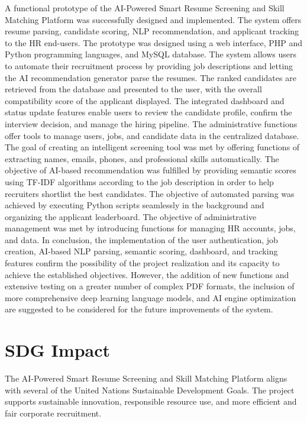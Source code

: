\documentclass[12pt,a4paper]{report}
\begin{document}
A functional prototype of the AI-Powered Smart Resume Screening and Skill Matching Platform was successfully designed and implemented. The system offers resume parsing, candidate scoring, NLP recommendation, and applicant tracking to the HR end-users. The prototype was designed using a web interface, PHP and Python programming languages, and MySQL database. The system allows users to automate their recruitment process by providing job descriptions and letting the AI recommendation generator parse the resumes. The ranked candidates are retrieved from the database and presented to the user, with the overall compatibility score of the applicant displayed. The integrated dashboard and status update features enable users to review the candidate profile, confirm the interview decision, and manage the hiring pipeline. The administrative functions offer tools to manage users, jobs, and candidate data in the centralized database. The goal of creating an intelligent screening tool was met by offering functions of extracting names, emails, phones, and professional skills automatically. The objective of AI-based recommendation was fulfilled by providing semantic scores using TF-IDF algorithms according to the job description in order to help recruiters shortlist the best candidates. The objective of automated parsing was achieved by executing Python scripts seamlessly in the background and organizing the applicant leaderboard. The objective of administrative management was met by introducing functions for managing HR accounts, jobs, and data. In conclusion, the implementation of the user authentication, job creation, AI-based NLP parsing, semantic scoring, dashboard, and tracking features confirm the possibility of the project realization and its capacity to achieve the established objectives. However, the addition of new functions and extensive testing on a greater number of complex PDF formats, the inclusion of more comprehensive deep learning language models, and AI engine optimization are suggested to be considered for the future improvements of the system.

\section{SDG Impact}

The AI-Powered Smart Resume Screening and Skill Matching Platform aligns with
several of the United Nations Sustainable Development Goals.
The project supports sustainable innovation, responsible resource use,
and more efficient and fair corporate recruitment.
\end{document}
